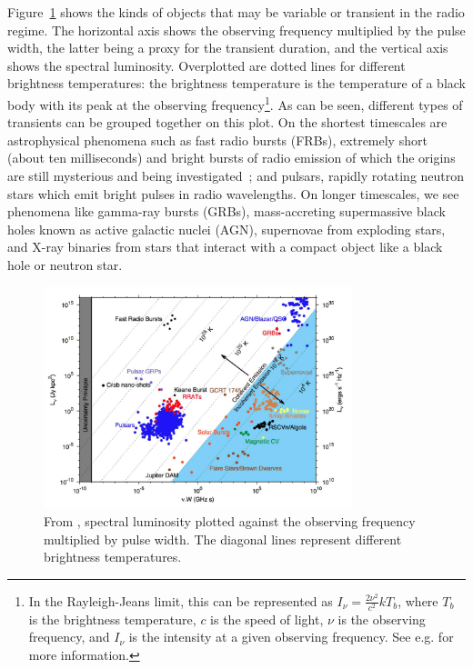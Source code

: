 \documentclass[12pt]{article}
\begin{document}
Figure~\ref{dario_var_lum} \citep{2015MNRAS.446.3687P} shows the kinds of objects that may be variable or transient in the radio regime. The horizontal axis shows the observing frequency multiplied by the pulse width, the latter being a proxy for the transient duration, and the vertical axis shows the spectral luminosity. Overplotted are dotted lines for different brightness temperatures: the brightness temperature is the temperature of a black body with its peak at the observing frequency\footnote{In the Rayleigh-Jeans limit, this can be represented as $I_{\nu}=\frac{2\nu^2}{c^2}kT_b$, where $T_b$ is the brightness temperature, $c$ is the speed of light, $\nu$ is the observing frequency, and $I_{\nu}$ is the intensity at a given observing frequency. See e.g. \citet{1986rpa..book.....R} for more information.}. As can be seen, different types of transients can be grouped together on this plot. On the shortest timescales are astrophysical phenomena such as fast radio bursts (FRBs), extremely short (about ten milliseconds) and bright bursts of radio emission of which the origins are still mysterious and being investigated~\citep{2021ApJS..257...59C}; and pulsars, rapidly rotating neutron stars which emit bright pulses in radio wavelengths. On longer timescales, we see phenomena like gamma-ray bursts (GRBs), mass-accreting supermassive black holes known as active galactic nuclei (AGN), supernovae from exploding stars, and X-ray binaries from stars that interact with a compact object like a black hole or neutron star. 

	\begin{figure}
		\begin{center}
			\includegraphics[width=0.8\textwidth]{dario_var_lum.png}
			\caption{From \cite{2015MNRAS.446.3687P}, spectral luminosity plotted against the observing frequency multiplied by pulse width. The diagonal lines represent different brightness temperatures.}
			\label{dario_var_lum}	
		\end{center}
	\end{figure}
\end{document}
